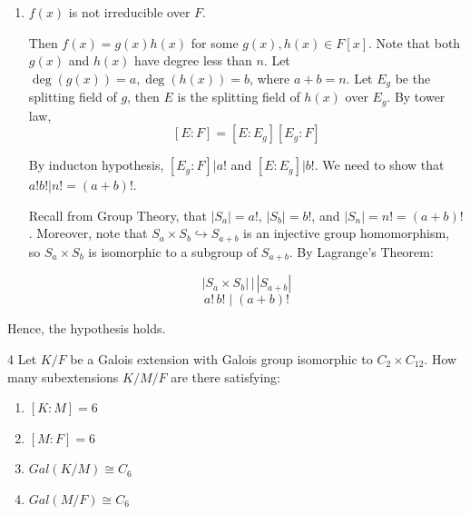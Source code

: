 \documentclass[12pt]{article}
\begin{document}
\begin{solution}
\begin{enumerate}
\begin{enumerate}
            Note that $(n-1)! n \big | n!$.
            
            \item $f(x)$ is not irreducible over $F$. 
            
            Then $f(x) = g(x)h(x)$ for some $g(x), h(x) \in F[x]$. Note that both $g(x)$ and $h(x)$ have degree less than $n$. Let $\deg(g(x)) = a, \deg(h(x)) = b$, where $a+b = n$. Let $E_g$ be the splitting field of $g$, then $E$ is the splitting field of $h(x)$ over $E_g$.
            By tower law, 
            \[[E:F] = [E:E_g][E_g:F]\]
            
            By inducton hypothesis, $[E_g:F] \big | a!$ and $[E:E_g] \big |b!$. We need to show that $a!b! \big | n! = (a+b)!$. 

            Recall from Group Theory, that $|S_a| = a!, \, |S_b| = b!$, and $|S_n| = n! = (a+b)!$. Moreover, note that  $S_a \times S_b \hookrightarrow S_{a+b}$ is an injective  group homomorphism, so $S_a \times S_b$ is isomorphic to a subgroup of $S_{a+b}$.  By Lagrange's Theorem: 
            
            \[|S_a \times S_b| \,\big |\, |S_{a+b}|\] 
            \[a!\,b! \mid (a+b)!\]



        \end{enumerate}
        Hence, the hypothesis holds. 
    \end{enumerate}
\end{solution}

\newpage 

\begin{problem}{4}
    Let $K/F$ be a Galois extension with Galois group isomorphic to $C_2 \times C_{12}$. How many subextensions $K/M/F$ are there satisfying:

    \begin{enumerate}
    \item[(a)] $[K : M] = 6$

    \item[(b)] $[M : F] = 6$

    \item[(c)] $Gal(K/M) \cong C_6$

    \item[(d)] $Gal(M/F) \cong C_6$
    \end{enumerate}
\end{problem}
\end{document}
